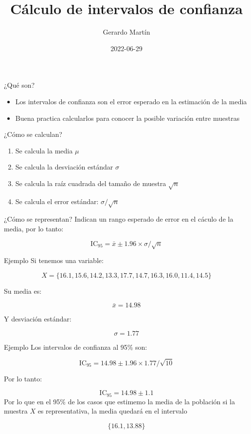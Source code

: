 \documentclass[
  11pt,
  ignorenonframetext,
]{beamer}
\title{Cálculo de intervalos de confianza}
\author{Gerardo Martín}
\date{2022-06-29}
\providecommand{\tightlist}{%
  \setlength{\itemsep}{0pt}\setlength{\parskip}{0pt}}
\begin{document}
\frame{\titlepage}

\begin{frame}{¿Qué son?}
\protect\hypertarget{quuxe9-son}{}
\begin{itemize}
\item
  Los intervalos de confianza son el error esperado en la estimación de
  la media
\item
  Buena practica calcularlos para conocer la posible variación entre
  muestras
\end{itemize}
\end{frame}

\begin{frame}{¿Cómo se calculan?}
\protect\hypertarget{cuxf3mo-se-calculan}{}
\begin{enumerate}
\tightlist
\item
  Se calcula la media \(\mu\)
\item
  Se calcula la desviación estándar \(\sigma\)
\item
  Se calcula la raíz cuadrada del tamaño de muestra \(\sqrt{n}\)
\item
  Se calcula el error estándar: \(\sigma/\sqrt{n}\)
\end{enumerate}
\end{frame}

\begin{frame}{¿Cómo se representan?}
\protect\hypertarget{cuxf3mo-se-representan}{}
Indican un rango esperado de error en el cáculo de la media, por lo
tanto:

\[\mathrm{IC}_{95} = \bar{x} \pm 1.96 \times \sigma /\sqrt{n}\]
\end{frame}

\begin{frame}{Ejemplo}
\protect\hypertarget{ejemplo}{}
Si tenemos una variable:

\[X = \{ 16.1, 15.6, 14.2, 13.3, 17.7, 14.7, 16.3, 16.0, 11.4, 14.5 \}\]

Su media es:

\[\bar{x} = 14.98\]

Y desviación estándar:

\[\sigma = 1.77\]
\end{frame}

\begin{frame}{Ejemplo}
\protect\hypertarget{ejemplo-1}{}
Los intervalos de confianza al 95\% son:

\[\mathrm{IC}_{95} = 14.98 \pm 1.96 \times 1.77/\sqrt{10}\]

Por lo tanto:

\[\mathrm{IC}_{95} = 14.98 \pm 1.1\] Por lo que en el 95\% de los casos
que estimemo la media de la población si la muestra \(X\) es
representativa, la media quedará en el intervalo

\[\{16.1, 13.88\}\]
\end{frame}
\end{document}
